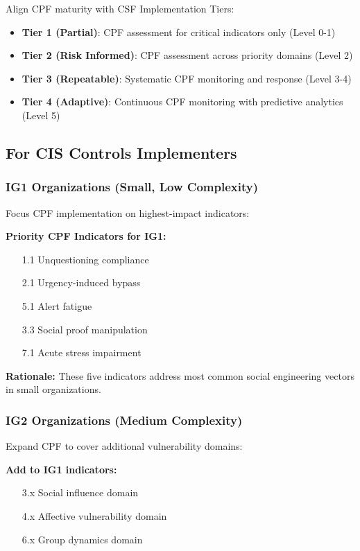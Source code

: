 \documentclass[11pt,a4paper]{article}
\begin{document}
Align CPF maturity with CSF Implementation Tiers:

\begin{itemize}
\item \textbf{Tier 1 (Partial)}: CPF assessment for critical indicators only (Level 0-1)
\item \textbf{Tier 2 (Risk Informed)}: CPF assessment across priority domains (Level 2)
\item \textbf{Tier 3 (Repeatable)}: Systematic CPF monitoring and response (Level 3-4)
\item \textbf{Tier 4 (Adaptive)}: Continuous CPF monitoring with predictive analytics (Level 5)
\end{itemize}

\subsection{For CIS Controls Implementers}

\subsubsection{IG1 Organizations (Small, Low Complexity)}

Focus CPF implementation on highest-impact indicators:

\textbf{Priority CPF Indicators for IG1:}
\begin{enumerate}
\item [1.1] Unquestioning compliance
\item [2.1] Urgency-induced bypass
\item [5.1] Alert fatigue
\item [3.3] Social proof manipulation
\item [7.1] Acute stress impairment
\end{enumerate}

\textbf{Rationale:} These five indicators address most common social engineering vectors in small organizations.

\subsubsection{IG2 Organizations (Medium Complexity)}

Expand CPF to cover additional vulnerability domains:

\textbf{Add to IG1 indicators:}
\begin{itemize}
\item [3.x] Social influence domain
\item [4.x] Affective vulnerability domain
\item [6.x] Group dynamics domain
\end{itemize}
\end{document}
